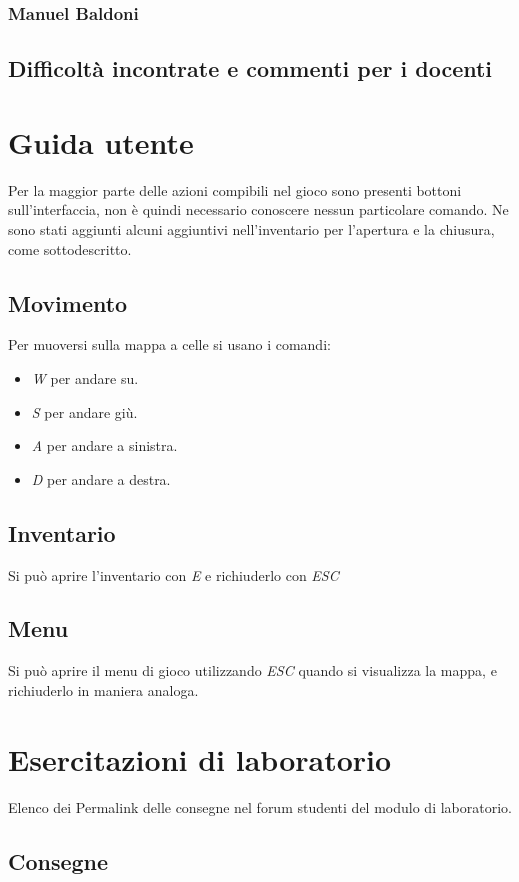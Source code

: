 \documentclass[a4paper,12pt]{report}
\begin{document}
\subsection*{Manuel Baldoni}

\section{Difficoltà incontrate e commenti per i docenti}

\appendix
\chapter{Guida utente}
Per la maggior parte delle azioni compibili nel gioco sono presenti bottoni sull'interfaccia, non è quindi necessario conoscere nessun particolare comando. Ne sono stati aggiunti alcuni aggiuntivi nell'inventario per l'apertura e la chiusura, come sottodescritto.
\section{Movimento}
Per muoversi sulla mappa a celle si usano i comandi:
\begin{itemize}
	\item \textit{W} per andare su.
	\item \textit{S} per andare giù.
	\item \textit{A} per andare a sinistra.
	\item \textit{D} per andare a destra.
\end{itemize}
\section{Inventario}
Si può aprire l'inventario con \textit{E} e richiuderlo con \textit{ESC}
\section{Menu}
Si può aprire il menu di gioco utilizzando \textit{ESC} quando si visualizza la mappa, e richiuderlo in maniera analoga.

\chapter{Esercitazioni di laboratorio}
Elenco dei Permalink delle consegne nel forum studenti del modulo di laboratorio.
\section*{Consegne}
\end{document}
